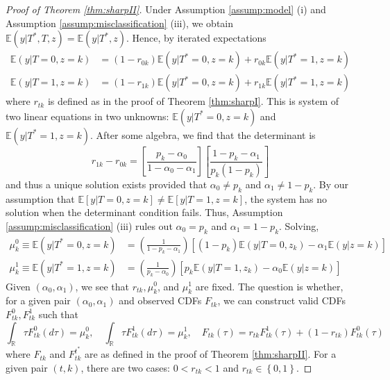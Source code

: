 \begin{proof}[Proof of Theorem \ref{thm:sharpII}]
Under Assumption \ref{assump:model} (i) and Assumption \ref{assump:misclassification} (iii), we obtain $\mathbb{E}(y|T^*,T,z) = \mathbb{E}(y|T^*,z)$.
Hence, by iterated expectations
  \begin{align*}
    \mathbb{E}(y|T=0,z=k) &= (1 - r_{0k}) \mathbb{E}(y|T^*=0,z=k) + r_{0k}\mathbb{E}(y|T^*=1,z=k)\\
    \mathbb{E}(y|T=1,z=k) &= (1 - r_{1k}) \mathbb{E}(y|T^*=0,z=k) + r_{1k}\mathbb{E}(y|T^*=1,z=k)
  \end{align*}
where $r_{tk}$ is defined as in the proof of Theorem \ref{thm:sharpI}.
This is system of two linear equations in two unknowns: $\mathbb{E}(y|T^*=0,z=k)$ and $\mathbb{E}(y|T^*=1,z=k)$.
After some algebra, we find that the determinant is
\[
  r_{1k} - r_{0k} = \left[ \frac{p_k - \alpha_0}{1 - \alpha_0 - \alpha_1} \right]\left[ \frac{1 - p_k - \alpha_1}{p_k(1 - p_k)} \right] 
\]
and thus a unique solution exists provided that $\alpha_0 \neq p_k$ and $\alpha_1 \neq 1 - p_k$.
By our assumption that $\mathbb{E}[y|T=0,z=k] \neq \mathbb{E}[y|T=1,z=k]$, the system has no solution when the determinant condition fails.
Thus, Assumption \ref{assump:misclassification} (iii) rules out $\alpha_0 = p_k$ and $\alpha_1 = 1-p_k$.
Solving,
\begin{align*}
  \mu^0_{k} \equiv \mathbb{E}(y|T^*=0,z=k) &= \left(\frac{1}{1 - p_k - \alpha_1}\right)\left[ (1 - p_k)\mathbb{E}(y|T=0,z_k) - \alpha_1 \mathbb{E}(y|z=k) \right]\\
  \mu^1_{k} \equiv \mathbb{E}(y|T^*=1,z=k) &= \left(\frac{1}{p_k - \alpha_0}\right)\left[ p_k\mathbb{E}(y|T=1,z_k) - \alpha_0 \mathbb{E}(y|z=k) \right]
\end{align*}
Given $(\alpha_0, \alpha_1)$, we see that $r_{tk}, \mu^0_k$, and $\mu^1_{k}$ are fixed.
The question is whether, for a given pair $(\alpha_0, \alpha_1)$ and observed CDFs $F_{tk}$, we can construct valid CDFs $F_{tk}^0, F_{tk}^1$ such that 
\[
  \int_{\mathbb{R}} \tau F_{tk}^0(d\tau) = \mu_k^0, \quad
  \int_{\mathbb{R}} \tau F_{tk}^1(d\tau) = \mu_k^1, \quad 
  F_{tk}(\tau) = r_{tk} F^1_{tk}(\tau) + (1 - r_{tk}) F^0_{tk}(\tau)
\]
where $F_{tk}$ and $F^{t^*}_{tk}$ are as defined in the proof of Theorem \ref{thm:sharpII}.
For a given pair $(t,k)$, there are two cases: $0 < r_{tk} < 1$ and $r_{tk} \in \left\{ 0, 1 \right\}$.



\end{proof}
